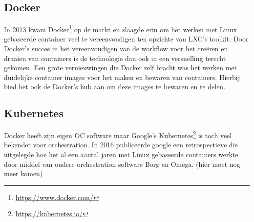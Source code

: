 \subsection{Docker}
In 2013 kwam Docker\footnote{\url{https://www.docker.com/}} op de markt en slaagde erin om het werken met Linux gebaseerde container veel te vereenvoudigen ten opzichte van LXC’s toolkit. Door Docker’s succes in het vereenvoudigen van de workflow voor het creëren en draaien van containers is de technologie dan ook in een versnelling terecht gekomen.  Een grote vernieuwingen die Docker zelf bracht was het werken met duidelijke container images voor het maken en bewaren van containers. Hierbij bied het ook de Docker’s hub aan om deze images te bewaren en te delen.\autocite{Eder2016}
\subsection{Kubernetes}
Docker heeft zijn eigen OC software maar Google’s Kubernetes\footnote{\url{https://kubernetes.io/}} is toch veel bekender voor orchestration. In 2016 publiceerde google een retrospectieve\autocite{Burns2016} die uitgelegde hoe het al een aantal jaren met Linux gebaseerde containers werkte door middel van oudere orchestration software Borg en Omega. (hier moet nog meer komen)  

